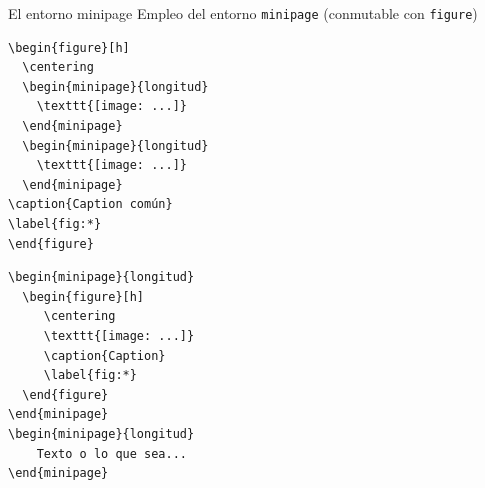 \documentclass[10pt]{beamer}
\begin{document}
\begin{frame}[fragile]{El entorno minipage}
Empleo del entorno \texttt{minipage} (conmutable con \texttt{figure})
\vspace{0.25cm}

\begin{minipage}{0.45\textwidth}
\begin{verbatim}
\begin{figure}[h]
  \centering
  \begin{minipage}{longitud}
    \texttt{[image: ...]}
  \end{minipage}
  \begin{minipage}{longitud}
    \texttt{[image: ...]}
  \end{minipage}
\caption{Caption común}
\label{fig:*}
\end{figure}
\end{verbatim}
\end{minipage}
\hspace{0.75cm}
\begin{minipage}{0.45\textwidth}
\begin{verbatim}
\begin{minipage}{longitud}
  \begin{figure}[h]
     \centering
     \texttt{[image: ...]}
     \caption{Caption}
     \label{fig:*}
  \end{figure}
\end{minipage}
\begin{minipage}{longitud}
    Texto o lo que sea...
\end{minipage}
\end{verbatim}
\end{minipage}
\end{frame}
\end{document}
